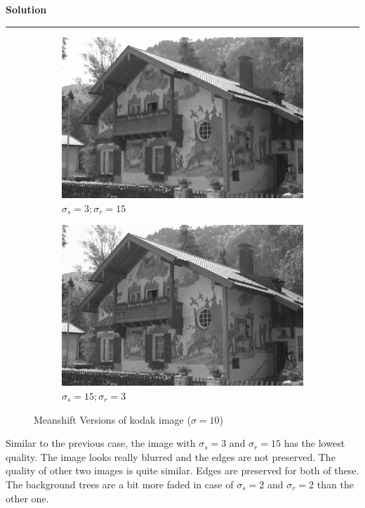 \documentclass[a4paper]{article}
\newenvironment{solution}[2][]{%
    \begin{mdframed}[linecolor=green!60!black, linewidth=2pt, roundcorner=10pt, backgroundcolor=green!5!white, skipabove=12pt, skipbelow=12pt]%
        \textbf{\large #2} %
        \par\noindent\rule{\textwidth}{0.4pt} %
        \vspace{0.5em} %
}{%
    \end{mdframed}%
}
\begin{document}
\begin{solution}{Solution}
\begin{figure}[H]
    \begin{subfigure}[b]{0.24\textwidth}
        \centering
        \includegraphics[width=\textwidth]{../images/filtered_kodak24_meanshift_sigma_10_sigma_s_3_sigma_r_15.png}
        \caption{$\sigma_s=3;\sigma_r=15$}
        \label{fig:subfig3}
    \end{subfigure}
    \begin{subfigure}[b]{0.24\textwidth}
        \centering
        \includegraphics[width=\textwidth]{../images/filtered_kodak24_meanshift_sigma_10_sigma_s_15_sigma_r_3.png}
        \caption{$\sigma_s=15;\sigma_r=3$}
        \label{fig:subfig3}
    \end{subfigure}
    
    \caption{Meanshift Versions of kodak image ($\sigma=10$)}
    \label{fig:overall}
\end{figure}


Similar to the previous case, the image with $\sigma_s = 3$ and $\sigma_r = 15$ has the lowest quality. The image looks really blurred and the edges are not preserved. The quality of other two images is quite similar. Edges are preserved for both of these. The background trees are a bit more faded in case of $\sigma_s=2$ and $\sigma_r=2$ than the other one.


\end{solution}
\end{document}

